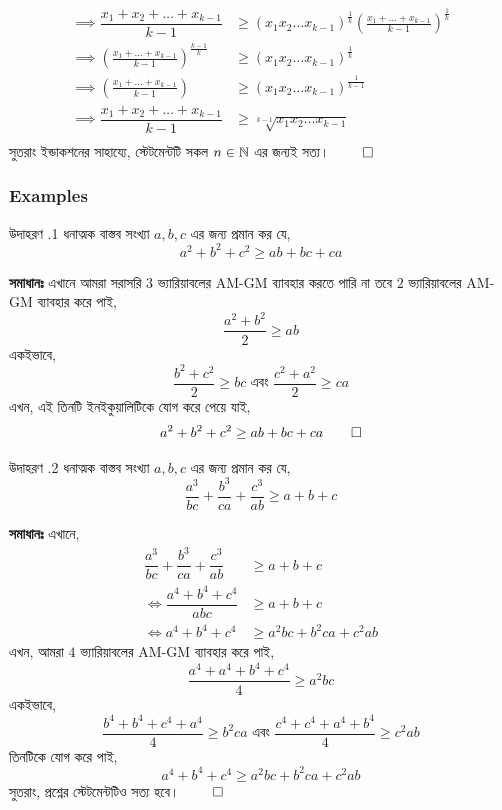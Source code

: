 \documentclass[12pt]{article}
\begin{document}
\begin{sol}
\begin{align*}
        \implies \dfrac{x_1+x_2+\dots +x_{k-1}}{k-1} &\geq \left(x_1x_2\dots x_{k-1} \right)^\frac{1}{k}  \left( \frac{x_1+\dots + x_{k-1}}{k-1}\right)^\frac{1}{k}\\
        \implies  \left( \frac{x_1+\dots + x_{k-1}}{k-1}\right)^\frac{k-1}{k} &\geq \left(x_1x_2\dots x_{k-1} \right)^\frac{1}{k} \\
        \implies  \left( \frac{x_1+\dots + x_{k-1}}{k-1}\right) &\geq \left(x_1x_2\dots x_{k-1} \right)^\frac{1}{k-1} \\
        \implies \dfrac{x_1+x_2+\dots + x_{k-1}}{k-1} &\geq \sqrt[k-1]{x_1x_2\dots x_{k-1}}\\
    \end{align*}
    সুতরাং ইন্ডাকশনের সাহায্যে, স্টেটমেন্টটি সকল $n \in \mathbb N$ এর জন্যই সত্য। $\qed$
\end{sol}
\subsubsection{Examples}
\begin{exam} {উদাহরণ \thesubsubsection.1}
    ধনাত্মক বাস্তব সংখ্যা $a,b,c$ এর জন্য প্রমান কর যে,
    $$ a^2+b^2+c^2 \geq ab+bc+ca $$
\end{exam}
\begin{sol}
    \textbf{সমাধানঃ} এখানে আমরা সরাসরি $3$ ভ্যারিয়াবলের AM-GM ব্যাবহার করতে পারি না তবে $2$ ভ্যারিয়াবলের 
    AM-GM ব্যাবহার করে পাই, $$\dfrac{a^2 + b^2}{2} \geq ab$$ 
    একইভাবে, $$\dfrac{b^2 + c^2}{2} \geq bc \text{ এবং } \dfrac{c^2 + a^2}{2} \geq ca$$
    এখন, এই তিনটি ইনইকুয়ালিটিকে যোগ করে পেয়ে যাই,
    $$a^2+b^2+c^2 \geq ab+bc+ca \qed$$
\end{sol}
\begin{exam} {উদাহরণ \thesubsubsection.2}
    ধনাত্মক বাস্তব সংখ্যা $a,b,c$ এর জন্য প্রমান কর যে,
    $$ \dfrac{a^3}{bc} + \dfrac{b^3}{ca} + \dfrac{c^3}{ab} \geq a+b+c $$
\end{exam}
\begin{sol}
    \textbf{সমাধানঃ} এখানে, \begin{align*}
        \dfrac{a^3}{bc} + \dfrac{b^3}{ca} + \dfrac{c^3}{ab} &\geq a+b+c\\
        \iff \dfrac{a^4 + b^4 + c^4}{abc} &\geq a+b+c\\
        \iff a^4+b^4+c^4 &\geq a^2bc+b^2ca+c^2ab
    \end{align*}
    এখন, আমরা $4$ ভ্যারিয়াবলের AM-GM ব্যাবহার করে পাই, 
    $$\dfrac{a^4 + a^4 + b^4 + c^4}{4} \geq a^2bc$$ 
    একইভাবে, $$\dfrac{b^4 + b^4 + c^4 + a^4}{4} \geq b^2ca \text{ এবং } \dfrac{c^4 + c^4 + a^4 + b^4}{4} \geq c^2ab$$
    তিনটিকে যোগ করে পাই, 
    $$a^4+b^4+c^4 \geq a^2bc+b^2ca+c^2ab$$
    সুতরাং, প্রশ্নের স্টেটমেন্টটিও সত্য হবে। $\qed$ 
\end{sol}
\end{document}
